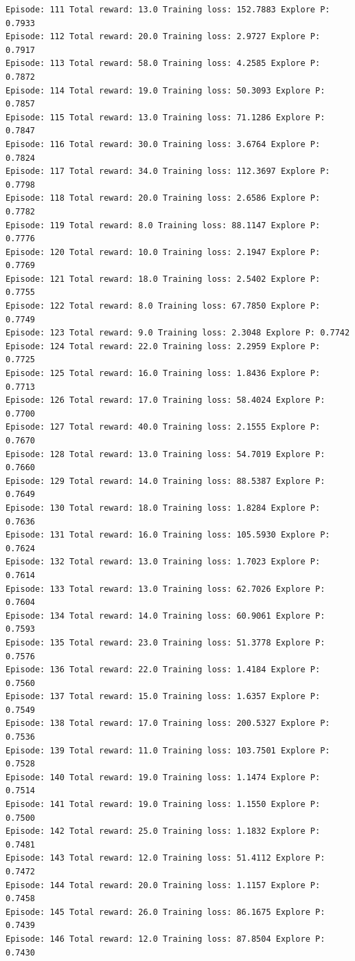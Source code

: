 \documentclass[11pt]{article}
\begin{document}
\begin{Verbatim}[commandchars=\\\{\}]
Episode: 111 Total reward: 13.0 Training loss: 152.7883 Explore P: 0.7933
Episode: 112 Total reward: 20.0 Training loss: 2.9727 Explore P: 0.7917
Episode: 113 Total reward: 58.0 Training loss: 4.2585 Explore P: 0.7872
Episode: 114 Total reward: 19.0 Training loss: 50.3093 Explore P: 0.7857
Episode: 115 Total reward: 13.0 Training loss: 71.1286 Explore P: 0.7847
Episode: 116 Total reward: 30.0 Training loss: 3.6764 Explore P: 0.7824
Episode: 117 Total reward: 34.0 Training loss: 112.3697 Explore P: 0.7798
Episode: 118 Total reward: 20.0 Training loss: 2.6586 Explore P: 0.7782
Episode: 119 Total reward: 8.0 Training loss: 88.1147 Explore P: 0.7776
Episode: 120 Total reward: 10.0 Training loss: 2.1947 Explore P: 0.7769
Episode: 121 Total reward: 18.0 Training loss: 2.5402 Explore P: 0.7755
Episode: 122 Total reward: 8.0 Training loss: 67.7850 Explore P: 0.7749
Episode: 123 Total reward: 9.0 Training loss: 2.3048 Explore P: 0.7742
Episode: 124 Total reward: 22.0 Training loss: 2.2959 Explore P: 0.7725
Episode: 125 Total reward: 16.0 Training loss: 1.8436 Explore P: 0.7713
Episode: 126 Total reward: 17.0 Training loss: 58.4024 Explore P: 0.7700
Episode: 127 Total reward: 40.0 Training loss: 2.1555 Explore P: 0.7670
Episode: 128 Total reward: 13.0 Training loss: 54.7019 Explore P: 0.7660
Episode: 129 Total reward: 14.0 Training loss: 88.5387 Explore P: 0.7649
Episode: 130 Total reward: 18.0 Training loss: 1.8284 Explore P: 0.7636
Episode: 131 Total reward: 16.0 Training loss: 105.5930 Explore P: 0.7624
Episode: 132 Total reward: 13.0 Training loss: 1.7023 Explore P: 0.7614
Episode: 133 Total reward: 13.0 Training loss: 62.7026 Explore P: 0.7604
Episode: 134 Total reward: 14.0 Training loss: 60.9061 Explore P: 0.7593
Episode: 135 Total reward: 23.0 Training loss: 51.3778 Explore P: 0.7576
Episode: 136 Total reward: 22.0 Training loss: 1.4184 Explore P: 0.7560
Episode: 137 Total reward: 15.0 Training loss: 1.6357 Explore P: 0.7549
Episode: 138 Total reward: 17.0 Training loss: 200.5327 Explore P: 0.7536
Episode: 139 Total reward: 11.0 Training loss: 103.7501 Explore P: 0.7528
Episode: 140 Total reward: 19.0 Training loss: 1.1474 Explore P: 0.7514
Episode: 141 Total reward: 19.0 Training loss: 1.1550 Explore P: 0.7500
Episode: 142 Total reward: 25.0 Training loss: 1.1832 Explore P: 0.7481
Episode: 143 Total reward: 12.0 Training loss: 51.4112 Explore P: 0.7472
Episode: 144 Total reward: 20.0 Training loss: 1.1157 Explore P: 0.7458
Episode: 145 Total reward: 26.0 Training loss: 86.1675 Explore P: 0.7439
Episode: 146 Total reward: 12.0 Training loss: 87.8504 Explore P: 0.7430

\end{Verbatim}
\end{document}
